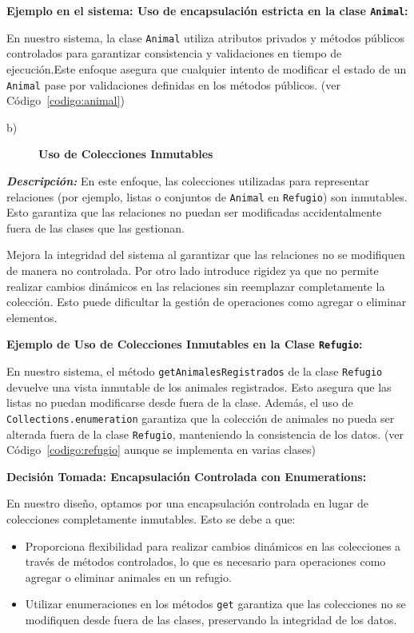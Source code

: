 \textbf{Ejemplo en el sistema: Uso de encapsulación estricta en la clase \texttt{Animal}:}\par  
En nuestro sistema, la clase \texttt{Animal} utiliza atributos privados y métodos públicos 
controlados para garantizar consistencia y validaciones en tiempo de ejecución.Este enfoque 
asegura que cualquier intento de modificar el estado de un \texttt{Animal} pase por 
validaciones definidas en los métodos públicos. (ver Código~\ref{codigo:animal})


\begin{description}
    \item[b)] \textbf{Uso de Colecciones Inmutables}
\end{description}

\textit{\textbf{Descripción:}}  
En este enfoque, las colecciones utilizadas para representar relaciones (por ejemplo, 
listas o conjuntos de \texttt{Animal} en \texttt{Refugio}) son inmutables. Esto garantiza 
que las relaciones no puedan ser modificadas accidentalmente fuera de las clases que las 
gestionan.
\vspace{0.15cm}

    Mejora la integridad del sistema al garantizar que las relaciones no se modifiquen de 
    manera no controlada.
    Por otro lado introduce rigidez ya que no permite realizar cambios dinámicos en las relaciones sin 
    reemplazar completamente la colección. Esto puede dificultar la gestión de operaciones 
    como agregar o eliminar elementos.\par
    \vspace{0.15cm}

\textbf{Ejemplo de Uso de Colecciones Inmutables en la Clase \texttt{Refugio}:}\par  
En nuestro sistema, el método \texttt{getAnimalesRegistrados} de la clase \texttt{Refugio} 
devuelve una vista inmutable de los animales registrados. Esto asegura que las listas no 
puedan modificarse desde fuera de la clase. Además, el uso de \texttt{Collections.}\texttt{enumeration} 
garantiza que la colección de animales no pueda ser alterada fuera de la clase \texttt{Refugio}, 
manteniendo la consistencia de los datos. (ver Código~\ref{codigo:refugio} aunque se implementa en varias clases)

\textbf{Decisión Tomada: Encapsulación Controlada con Enumerations:}\par
En nuestro diseño, optamos por una encapsulación controlada en lugar de colecciones 
completamente inmutables. Esto se debe a que:
\begin{itemize}
    \item Proporciona flexibilidad para realizar cambios dinámicos en las colecciones a 
    través de métodos controlados, lo que es necesario para operaciones como agregar o 
    eliminar animales en un refugio.
    \item Utilizar enumeraciones en los métodos \texttt{get} garantiza que las colecciones 
    no se modifiquen desde fuera de las clases, preservando la integridad de los datos.
\end{itemize}

